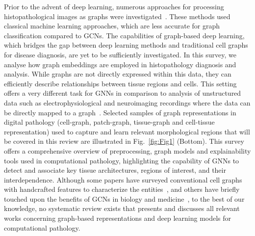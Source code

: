 Prior to the advent of deep learning, numerous approaches for processing histopathological images as graphs were investigated~. 
These methods used classical machine learning approaches, which are less accurate for graph classification compared to GCNs. 
The capabilities of graph-based deep learning, which bridges the gap between deep learning methods and traditional cell graphs for disease diagnosis, are yet to be sufficiently investigated.
In this survey, we analyse how graph embeddings are employed in histopathology diagnosis and analysis. 
While graphs are not directly expressed within this data, they can efficiently describe relationships between tissue regions and cells. 
This setting offers a very different task for GNNs in comparison to analysis of unstructured data such as electrophysiological and neuroimaging recordings where the data can be directly mapped to a graph{~}.
Selected samples of graph representations in digital pathology (cell-graph, patch-graph, tissue-graph and cell-tissue representation) used to capture and learn relevant morphological regions that will be covered in this review are illustrated in Fig.{~\ref{fig:Fig1}} (Bottom).
This survey offers a comprehensive overview of preprocessing, graph models and explainability tools used in computational pathology, highlighting the capability of GNNs to detect and associate key tissue architectures, regions of interest, and their interdependence.
Although some papers have surveyed conventional cell graphs with handcrafted features to characterize the entities~, and others have briefly touched upon the benefits of GCNs in biology and medicine{~}, to the best of our knowledge, no systematic review exists that presents and discusses all relevant works concerning graph-based representations and deep learning models for computational pathology.
\vspace{-6pt}

